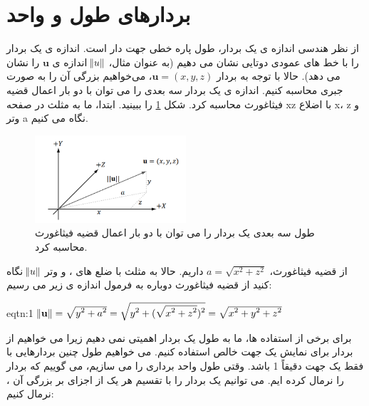 \section{\textbf{بردارهای طول و واحد}}
{
    \Large
    \begin{spacing}{1.5}
        از نظر هندسی اندازه ی یک بردار، طول پاره خطی جهت دار است.
        اندازه ی یک بردار را با خط های عمودی دوتایی نشان می دهیم
        (به عنوان مثال، $\norm{u}$ اندازه ی $\textbf{u}$ را نشان می دهد).
        حالا با توجه به بردار $\textbf{u}=(x,y,z)$، می‌خواهیم بزرگی آن را به صورت جبری محاسبه کنیم.
        اندازه ی یک بردار سه بعدی را می توان با دو بار اعمال قضیه فیثاغورث محاسبه کرد.
        شکل \ref{fig:4.Session.1.1.8} را ببینید. ابتدا، ما به مثلث در صفحه xz با اضلاع x، z و وتر a نگاه می کنیم.

        \begin{figure}[H]
            \centering
            \setlength{\belowcaptionskip}{-10pt}
            \includegraphics[width=0.5\textwidth]{Images/4/4.Session.1.1.8}
            \caption{طول سه بعدی یک بردار را می توان با دو بار اعمال قضیه فیثاغورث محاسبه کرد.}
            \label{fig:4.Session.1.1.8}
        \end{figure}

        از قضیه فیثاغورث، $a=\sqrt{\displaystyle x^2+z^2}$ داریم.
        حالا به مثلث با ضلع های ،  و وتر $\norm{u}$ نگاه کنید از قضیه فیثاغورث دوباره به فرمول اندازه ی زیر می رسیم:

        \begin{eqtn}{eqtn:1}
            \centering
            $\norm{\textbf{u}}=\sqrt{\displaystyle y^2+a^2}=\sqrt{\displaystyle y^2+(\sqrt{\displaystyle x^2+z^2})^2}=\sqrt{\displaystyle x^2+y^2+z^2}$
        \end{eqtn}

        برای برخی از استفاده ها، ما به طول یک بردار اهمیتی نمی دهیم زیرا می خواهیم از بردار برای نمایش یک جهت خالص استفاده کنیم.
        می خواهیم طول چنین بردارهایی با فقط یک جهت دقیقاً 1 باشد.
        وقتی طول واحد برداری را می سازیم، می گوییم که بردار را نرمال کرده ایم.
        می توانیم یک بردار را با تقسیم هر یک از اجزای بر بزرگی آن ، نرمال کنیم:


\end{spacing}}
